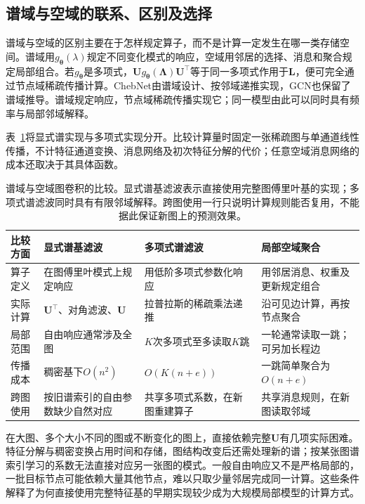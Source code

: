 \subsection{谱域与空域的联系、区别及选择}
\label{sec:gnn-spectral-spatial-comparison}

谱域与空域的区别主要在于怎样规定算子，而不是计算一定发生在哪一类存储空间。谱域用$g_{\bm{\theta}}(\lambda)$规定不同变化模式的响应，空域用邻居的选择、消息和聚合规定局部组合。若$g_{\bm{\theta}}$是多项式，$\bm{U}g_{\bm{\theta}}(\bm{\Lambda})\bm{U}^{\top}$等于同一多项式作用于$\bm{L}$，便可完全通过节点域稀疏传播计算。ChebNet由谱域设计、按邻域递推实现，GCN也保留了谱域推导。谱域规定响应，节点域稀疏传播实现它；同一模型由此可以同时具有频率与局部邻域解释。

表~\ref{tab:gnn-spectral-spatial}将显式谱实现与多项式实现分开。比较计算量时固定一张稀疏图与单通道线性传播，不计特征通道变换、消息网络及初次特征分解的代价；任意空域消息网络的成本还取决于其具体函数。
\begin{table}[htb]
  \centering
  \small
  \begin{tabularx}{\linewidth}{@{}p{17mm}XXX@{}}
    \toprule
    比较方面 & 显式谱基滤波 & 多项式谱滤波 & 局部空域聚合\\
    \midrule
    算子定义 & 在图傅里叶模式上规定响应 & 用低阶多项式参数化响应 & 用邻居消息、权重及更新规定组合\\
    实际计算 & $\bm{U}^{\top}$、对角滤波、$\bm{U}$ & 拉普拉斯的稀疏乘法递推 & 沿可见边计算，再按节点聚合\\
    局部范围 & 自由响应通常涉及全图 & $K$次多项式至多读取$K$跳 & 一轮通常读取一跳；可另加长程边\\
    传播成本 & 稠密基下$O(n^2)$ & $O(K(n+e))$ & 一跳简单聚合为$O(n+e)$\\
    跨图使用 & 按旧谱索引的自由参数缺少自然对应 & 共享多项式系数，在新图重建算子 & 共享消息规则，在新图读取邻域\\
    \bottomrule
  \end{tabularx}
  \caption{谱域与空域图卷积的比较。显式谱基滤波表示直接使用完整图傅里叶基的实现；多项式谱滤波同时具有有限邻域解释。跨图使用一行只说明计算规则能否复用，不能据此保证新图上的预测效果。}
  \label{tab:gnn-spectral-spatial}
\end{table}

在大图、多个大小不同的图或不断变化的图上，直接依赖完整$\bm{U}$有几项实际困难。特征分解与稠密变换占用时间和存储，图结构改变后还需处理新的谱；按某张图谱索引学习的系数无法直接对应另一张图的模式。一般自由响应又不是严格局部的，一批目标节点可能依赖大量其他节点，难以只取少量邻居完成同一计算。这些条件解释了为何直接使用完整特征基的早期实现较少成为大规模局部模型的计算方式。

